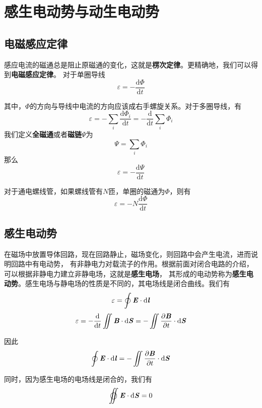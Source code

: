 \documentclass[UTF8,openany]{book}
\begin{document}
	\section{感生电动势与动生电动势}
	\subsection{电磁感应定律}
	\par 感应电流的磁通总是阻止原磁通的变化，这就是\textbf{楞次定律}。更精确地，我们可以得到\textbf{电磁感应定律}。
	对于单圈导线
	\[
	\varepsilon=-\frac{\mathrm{d}\Phi}{\mathrm{d}t}	
	\]
	\par 其中，$\Phi$的方向与导线中电流的方向应该成右手螺旋关系。对于多圈导线，有
	\[
	\varepsilon=-\sum_{i}\frac{\mathrm{d}\Phi_i}{\mathrm{d}t}=-\frac{\mathrm{d}}{\mathrm{d}t}\sum_{i}\Phi_i	
	\]
	我们定义\textbf{全磁通}或者\textbf{磁链}$\Psi$为
	\[
	\Psi=\sum_{i}\Phi_i	
	\]
	那么
	\[
	\varepsilon=-\frac{\mathrm{d}\Psi}{\mathrm{d}t}	
	\]
	\par 对于通电螺线管，如果螺线管有$N$匝，单圈的磁通为$\Phi$，则有
	\[
	\varepsilon=-N\frac{\mathrm{d}\Phi}{\mathrm{d}t}	
	\]
	\subsection{感生电动势}
	\par 在磁场中放置导体回路，现在回路静止，磁场变化，则回路中会产生电流，进而说明回路中有电动势，
	有非静电力对载流子的作用。根据前面对闭合电路的介绍，可以根据非静电力建立非静电场，这就是\textbf{感生电场}，
	其形成的电动势称为\textbf{感生电动势}。感生电场与静电场的性质是不同的，其电场线是闭合曲线。我们有
	\[
	\varepsilon=\oint\textbf{\textit{E}}\cdot\mathrm{d}\textbf{\textit{l}}	
	\]
	\[
	\varepsilon=-\frac{\mathrm{d}}{\mathrm{d}t}\iint\textbf{\textit{B}}\cdot\mathrm{d}\textbf{\textit{S}}
	=-\iint\frac{\partial\textbf{\textit{B}}}{\partial t}\cdot\mathrm{d}\textbf{\textit{S}}
	\]
	\par 因此
	\[
	\oint\textbf{\textit{E}}\cdot\mathrm{d}\textbf{\textit{l}}=
	-\iint\frac{\partial\textbf{\textit{B}}}{\partial t}\cdot\mathrm{d}\textbf{\textit{S}}
	\]
	\par 同时，因为感生电场的电场线是闭合的，我们有
	\[
	\varoiint\textbf{\textit{E}}\cdot\mathrm{d}\textbf{\textit{S}}=0	
	\]
\end{document}
